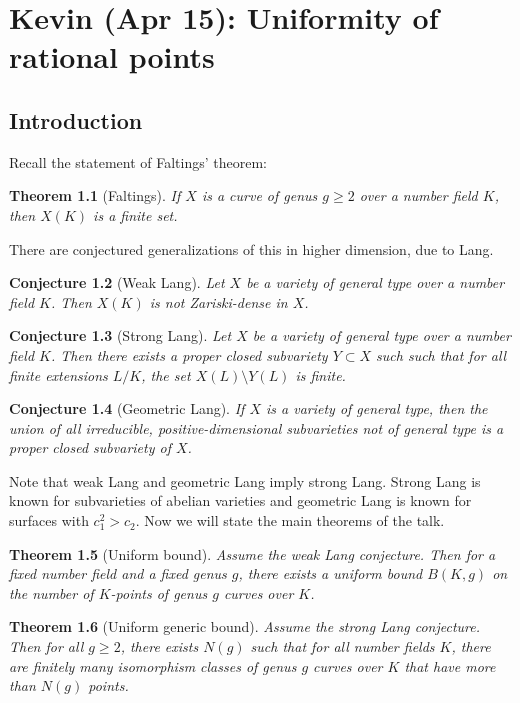 \documentclass[leqno, openany]{memoir}
\newtheorem{thm}{Theorem}[section]
\newtheorem{conj}[thm]{Conjecture}
\theoremstyle{definition}
\theoremstyle{remark}
\theoremstyle{plain}
\theoremstyle{definition}
\theoremstyle{remark}
\begin{document}
\chapter{Kevin (Apr 15): Uniformity of rational points}%

\section{Introduction}

Recall the statement of Faltings' theorem:
\begin{thm}[Faltings]
    If $X$ is a curve of genus $g \geq 2$ over a number field $K$, then $X(K)$ is a finite set.
\end{thm}

There are conjectured generalizations of this in higher dimension, due to Lang.
\begin{conj}[Weak Lang]
    Let $X$ be a variety of general type over a number field $K$. Then $X(K)$ is not Zariski-dense in $X$.
\end{conj}

\begin{conj}[Strong Lang]
    Let $X$ be a variety of general type over a number field $K$. Then there exists a proper closed subvariety $Y \subset X$ such such that for all finite extensions $L/K$, the set $X(L) \setminus Y(L)$ is finite.
\end{conj}

\begin{conj}[Geometric Lang]
    If $X$ is a variety of general type, then the union of all irreducible, positive-dimensional subvarieties not of general type is a proper closed subvariety of $X$.
\end{conj}

Note that weak Lang and geometric Lang imply strong Lang. Strong Lang is known for subvarieties of abelian varieties and geometric Lang is known for surfaces with $c_1^2 > c_2$. Now we will state the main theorems of the talk.

\begin{thm}[Uniform bound]
    Assume the weak Lang conjecture. Then for a fixed number field and a fixed genus $g$, there exists a uniform bound $B(K, g)$ on the number of $K$-points of genus $g$ curves over $K$.
\end{thm}

\begin{thm}[Uniform generic bound]
    Assume the strong Lang conjecture. Then for all $g \geq 2$, there exists $N(g)$ such that for all number fields $K$, there are finitely many isomorphism classes of genus $g$ curves over $K$ that have more than $N(g)$ points.
\end{thm}
\end{document}
